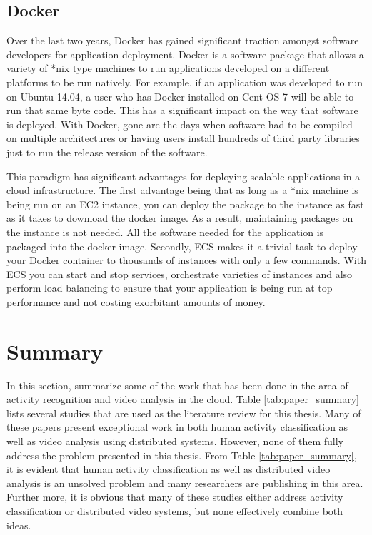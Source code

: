 \subsection{\label{subsection:docker}Docker}
Over the last two years, Docker has gained significant traction amongst software
developers for application deployment. Docker is a software package that allows
a variety of *nix type machines to run applications developed on a different
platforms to be run natively. For example, if an application was developed to run
on Ubuntu 14.04, a user who has Docker installed on Cent OS 7 will be able to
run that same byte code. This has a significant impact on the way that software
is deployed. With Docker, gone are the days when software had to be compiled on
multiple architectures or having users install hundreds of third
party libraries just to run the release version of the software.

This paradigm has significant advantages for deploying scalable applications
in a cloud infrastructure. The first advantage being that as long as a *nix
machine is being run on an EC2 instance, you can deploy the package to the instance as
fast as it takes to download the docker image. As a result, maintaining packages
on the instance is not needed. All the software needed for the application
is packaged into the docker image. Secondly, ECS makes it a trivial task to deploy
your Docker container to thousands of instances with only a few commands. With
ECS you can start and stop services, orchestrate varieties of instances and
also perform load balancing to ensure that your application is being run at
top performance and not costing exorbitant amounts of money.

\section{\label{section:bkg_summary}Summary}
In this section, summarize some of the work that has been done in the area
of activity recognition and video analysis in the cloud. Table \ref{tab:paper_summary}
lists several studies that are used as the literature review for this thesis.
Many of these papers present exceptional work in both human activity classification
as well as video analysis using distributed systems. However, none of them
fully address the problem presented in this thesis. From Table \ref{tab:paper_summary},
it is evident that human activity classification as well as distributed video
analysis is an unsolved problem and many researchers are publishing in this area.
Further more, it is obvious that many of these studies either address activity
classification or distributed video systems, but none effectively combine both
ideas.

